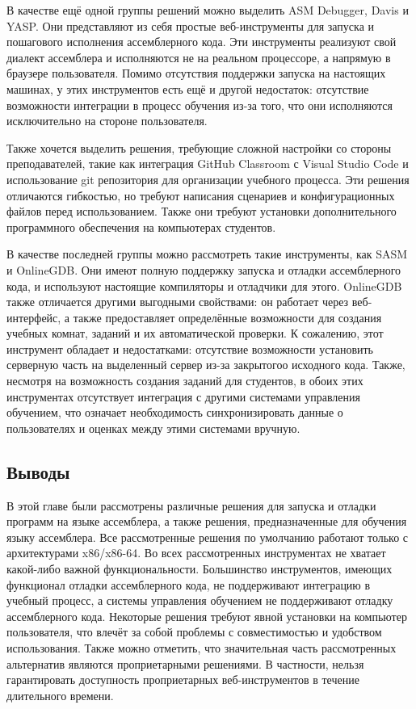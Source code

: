 \documentclass[a4paper,article,14pt]{extarticle}
\begin{document}
В качестве ещё одной группы решений можно выделить ASM Debugger, Davis и YASP. Они представляют из себя простые веб-инструменты для запуска и пошагового исполнения ассемблерного кода. Эти инструменты реализуют свой диалект ассемблера и исполняются не на реальном процессоре, а напрямую в браузере пользователя. Помимо отсутствия поддержки запуска на настоящих машинах, у этих инструментов есть ещё и другой недостаток: отсутствие возможности интеграции в процесс обучения из-за того, что они исполняются исключительно на стороне пользователя.

Также хочется выделить решения, требующие сложной настройки со стороны преподавателей, такие как интеграция GitHub Classroom с Visual Studio Code и использование git репозитория для организации учебного процесса. Эти решения отличаются гибкостью, но требуют написания сценариев и конфигурационных файлов перед использованием. Также они требуют установки дополнительного программного обеспечения на компьютерах студентов.

В качестве последней группы можно рассмотреть такие инструменты, как SASM и OnlineGDB. Они имеют полную поддержку запуска и отладки ассемблерного кода, и используют настоящие компиляторы и отладчики для этого. OnlineGDB также отличается другими выгодными свойствами: он работает через веб-интерфейс, а также предоставляет определённые возможности для создания учебных комнат, заданий и их автоматической проверки. К сожалению, этот инструмент обладает и недостатками: отсутствие возможности установить серверную часть на выделенный сервер из-за закрытогоо исходного кода. Также, несмотря на возможность создания заданий для студентов, в обоих этих инструментах отсутствует интеграция с другими системами управления обучением, что означает необходимость синхронизировать данные о пользователях и оценках между этими системами вручную.

\subsection{Выводы}

В этой главе были рассмотрены различные решения для запуска и отладки программ на языке ассемблера, а также решения, предназначенные для обучения языку ассемблера. Все рассмотренные решения по умолчанию работают только с архитектурами x86/x86-64. Во всех рассмотренных инструментах не хватает какой-либо важной функциональности. Большинство инструментов, имеющих функционал отладки ассемблерного кода, не поддерживают интеграцию в учебный процесс, а системы управления обучением не поддерживают отладку ассемблерного кода. Некоторые решения требуют явной установки на компьютер пользователя, что влечёт за собой проблемы с совместимостью и удобством использования. Также можно отметить, что значительная часть рассмотренных альтернатив являются проприетарными решениями. В частности, нельзя гарантировать доступность проприетарных веб-инструментов в течение длительного времени.
\end{document}
